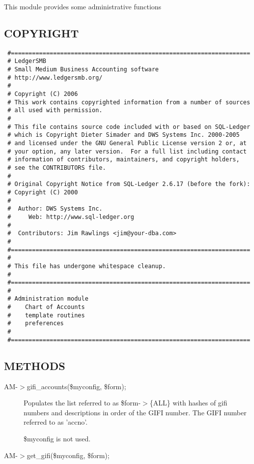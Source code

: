 \begin{description}
\begin{description}
\begin{description}
\begin{description}
\begin{description}
\begin{description}
This module provides some administrative functions

\subsection*{COPYRIGHT\label{LedgerSMB::AM_COPYRIGHT}}
\begin{verbatim}
 #====================================================================
 # LedgerSMB
 # Small Medium Business Accounting software
 # http://www.ledgersmb.org/
 #
 # Copyright (C) 2006
 # This work contains copyrighted information from a number of sources
 # all used with permission.
 #
 # This file contains source code included with or based on SQL-Ledger
 # which is Copyright Dieter Simader and DWS Systems Inc. 2000-2005
 # and licensed under the GNU General Public License version 2 or, at
 # your option, any later version.  For a full list including contact
 # information of contributors, maintainers, and copyright holders,
 # see the CONTRIBUTORS file.
 #
 # Original Copyright Notice from SQL-Ledger 2.6.17 (before the fork):
 # Copyright (C) 2000
 #
 #  Author: DWS Systems Inc.
 #     Web: http://www.sql-ledger.org
 #
 #  Contributors: Jim Rawlings <jim@your-dba.com>
 #
 #====================================================================
 #
 # This file has undergone whitespace cleanup.
 #
 #====================================================================
 #
 # Administration module
 #    Chart of Accounts
 #    template routines
 #    preferences
 #
 #====================================================================
\end{verbatim}
\subsection*{METHODS\label{LedgerSMB::AM_METHODS}}
\begin{description}

\item[{AM-$>$gifi\_accounts(\$myconfig, \$form);}] \mbox{}

Populates the list referred to as \$form-$>$\{ALL\} with hashes of gifi numbers and
descriptions in order of the GIFI number.  The GIFI number referred to as
'accno'.



\$myconfig is not used.


\item[{AM-$>$get\_gifi(\$myconfig, \$form);}] \mbox{}


\end{description}
\end{description}
\end{description}
\end{description}
\end{description}
\end{description}
\end{description}
